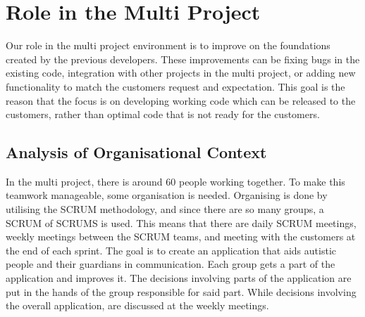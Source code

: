 \chapter{Role in the Multi Project}
Our role in the multi project environment is to improve on the foundations created by the previous developers.
These improvements can be fixing bugs in the existing code, integration with other projects in the multi project, or adding new functionality to match the customers request and expectation.
This goal is the reason that the focus is on developing working code which can be released to the customers, rather than optimal code that is not ready for the customers.


\section{Analysis of Organisational Context}
In the multi project, there is around 60 people working together. 
To make this teamwork manageable, some organisation is needed.
Organising is done by utilising the SCRUM methodology, and since there are so many groups, a SCRUM of SCRUMS is used.
This means that there are daily SCRUM meetings, weekly meetings between the SCRUM teams, and meeting with the customers at the end of each sprint.
The goal is to create an application that aids autistic people and their guardians in communication.
Each group gets a part of the application and improves it. 
The decisions involving parts of the application are put in the hands of the group responsible for said part.
While decisions involving the overall application, are discussed at the weekly meetings.

